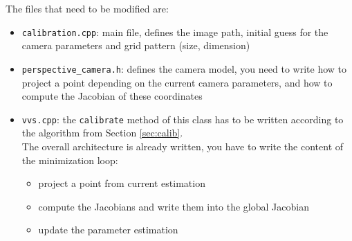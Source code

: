 \documentclass{ecnreport}
\begin{document}
The files that need to be modified are:
\begin{itemize}
 \item \texttt{calibration.cpp}: main file, defines the image path, initial guess for the camera parameters and grid pattern (size, dimension)
 \item \texttt{perspective\_camera.h}: defines the camera model, you need to write how to project a point depending on the current camera parameters, and how to compute the Jacobian of these
 coordinates
 \item \texttt{vvs.cpp}: the \texttt{calibrate} method of this class has to be written according to the algorithm from Section \ref{sec:calib}.\\
 The overall architecture is already written, you have to write the content of the minimization loop:
 \begin{itemize}
  \item project a point from current estimation
  \item compute the Jacobians and write them into the global Jacobian
  \item  update the parameter estimation
 \end{itemize}
\end{itemize}
\end{document}
